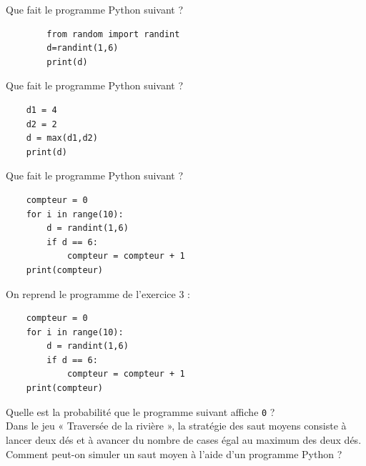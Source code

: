 \documentclass[a4paper,11pt,exos]{nsi} %
\begin{document}
\classe{\seconde}
\maketitle

Que fait le programme Python suivant ?\\
\begin{pyc}
    \begin{verbatim}
        from random import randint
        d=randint(1,6)
        print(d)
    \end{verbatim}
\end{pyc}


Que fait le programme Python suivant ?\\
\begin{pyc}
    \begin{verbatim}
    d1 = 4
    d2 = 2
    d = max(d1,d2)
    print(d)
    \end{verbatim}
\end{pyc}

Que fait le programme Python suivant ?\\
\begin{pyc}
    \begin{verbatim}
    compteur = 0
    for i in range(10):
        d = randint(1,6)
        if d == 6:
            compteur = compteur + 1
    print(compteur)
    \end{verbatim}
\end{pyc}

\newpage

On reprend le programme de l'exercice 3 :

\begin{pyc}
    \begin{verbatim}
    compteur = 0
    for i in range(10):
        d = randint(1,6)
        if d == 6:
            compteur = compteur + 1
    print(compteur)
    \end{verbatim}
\end{pyc}
Quelle est la probabilité que le programme suivant affiche \texttt{0}  ?\\


Dans le jeu « Traversée de la rivière », la stratégie des saut moyens consiste à lancer deux dés et à avancer du nombre de cases égal au maximum des deux dés.\\[.5em]
Comment peut-on simuler un saut moyen à l'aide d'un programme Python ?
\end{document}
